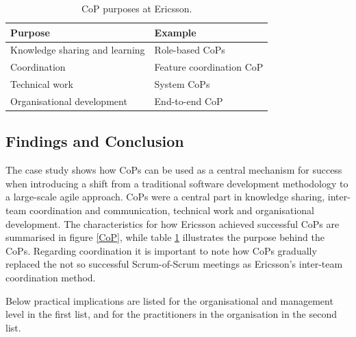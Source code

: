 \begin{table}[H]
\begin{center}
    \begin{tabular}{| p{6cm} | p{6cm} |}
    \hline
    \textbf{Purpose} & \textbf{Example} \\ \hline
    Knowledge sharing and learning & Role-based CoPs \\ \hline
    Coordination & Feature coordination CoP  \\ \hline
    Technical work & System CoPs \\ \hline
    Organisational development & End-to-end CoP \\ \hline
    \end{tabular}
    \caption{CoP purposes at Ericsson.}
    \label{cpae}
\end{center}
\end{table}

\subsection{Findings and Conclusion}

The case study shows how CoPs can be used as a central mechanism for success when introducing a shift from a traditional software development methodology to a large-scale agile approach. CoPs were a central part in knowledge sharing, inter-team coordination and communication, technical work and organisational development. The characteristics for how Ericsson achieved successful CoPs are summarised in figure \ref{CoP}, while table \ref{cpae} illustrates the purpose behind the CoPs. Regarding coordination it is important to note how CoPs gradually replaced the not so successful Scrum-of-Scrum meetings as Ericsson's inter-team coordination method.

Below practical implications are listed for the organisational and management level in the first list, and for the practitioners in the organisation in the second list.


